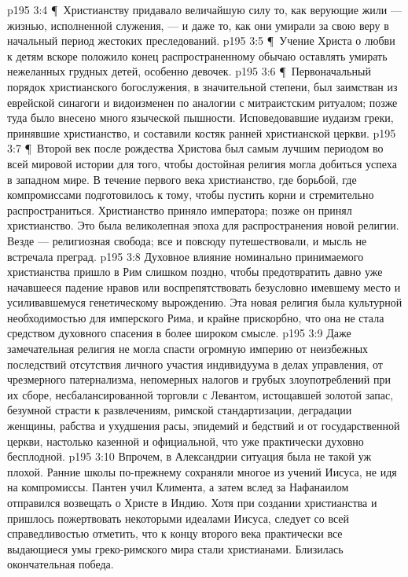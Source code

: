 \vs p195 3:4 \P\ Христианству придавало величайшую силу то, как верующие жили --- жизнью, исполненной служения, --- и даже то, как они умирали за свою веру в начальный период жестоких преследований.
\vs p195 3:5 \P\ Учение Христа о любви к детям вскоре положило конец распространенному обычаю оставлять умирать нежеланных грудных детей, особенно девочек.
\vs p195 3:6 \P\ Первоначальный порядок христианского богослужения, в значительной степени, был заимстван из еврейской синагоги и видоизменен по аналогии с митраистским ритуалом; позже туда было внесено много языческой пышности. Исповедовавшие иудаизм греки, принявшие христианство, и составили костяк ранней христианской церкви.
\vs p195 3:7 \P\ Второй век после рождества Христова был самым лучшим периодом во всей мировой истории для того, чтобы достойная религия могла добиться успеха в западном мире. В течение первого века христианство, где борьбой, где компромиссами подготовилось к тому, чтобы пустить корни и стремительно распространиться. Христианство приняло императора; позже он принял христианство. Это была великолепная эпоха для распространения новой религии. Везде --- религиозная свобода; все и повсюду путешествовали, и мысль не встречала преград.
\vs p195 3:8 Духовное влияние номинально принимаемого христианства пришло в Рим слишком поздно, чтобы предотвратить давно уже начавшееся падение нравов или воспрепятствовать безусловно имевшему место и усиливавшемуся генетическому вырождению. Эта новая религия была культурной необходимостью для имперского Рима, и крайне прискорбно, что она не стала средством духовного спасения в более широком смысле.
\vs p195 3:9 Даже замечательная религия не могла спасти огромную империю от неизбежных последствий отсутствия личного участия индивидуума в делах управления, от чрезмерного патернализма, непомерных налогов и грубых злоупотреблений при их сборе, несбалансированной торговли с Левантом, истощавшей золотой запас, безумной страсти к развлечениям, римской стандартизации, деградации женщины, рабства и ухудшения расы, эпидемий и бедствий и от государственной церкви, настолько казенной и официальной, что уже практически духовно бесплодной.
\vs p195 3:10 Впрочем, в Александрии ситуация была не такой уж плохой. Ранние школы по\hyp{}прежнему сохраняли многое из учений Иисуса, не идя на компромиссы. Пантен учил Климента, а затем вслед за Нафанаилом отправился возвещать о Христе в Индию. Хотя при создании христианства и пришлось пожертвовать некоторыми идеалами Иисуса, следует со всей справедливостью отметить, что к концу второго века практически все выдающиеся умы греко\hyp{}римского мира стали христианами. Близилась окончательная победа.
